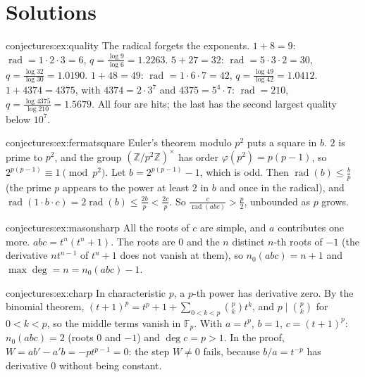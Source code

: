 \section{Solutions}

\begin{solution}{conjectures:ex:quality}
\idea The radical forgets the exponents.
\writeup $1+8=9$: $\operatorname{rad}=1\cdot2\cdot3=6$, $q=\frac{\log9}{\log6}=1.2263$. $5+27=32$: $\operatorname{rad}=5\cdot3\cdot2=30$,
$q=\frac{\log32}{\log30}=1.0190$. $1+48=49$: $\operatorname{rad}=1\cdot6\cdot7=42$, $q=\frac{\log49}{\log42}=1.0412$. $1+4374=4375$, with $4374=2\cdot3^7$ and
$4375=5^4\cdot7$: $\operatorname{rad}=210$, $q=\frac{\log4375}{\log210}=1.5679$. All four are hits; the last has the second largest quality below
$10^7$.
\end{solution}

\begin{solution}{conjectures:ex:fermatsquare}
\idea Euler's theorem modulo $p^2$ puts a square in $b$.
\writeup $2$ is prime to $p^2$, and the group $(\mathbb Z/p^2\mathbb Z)^\times$ has order $\varphi(p^2)=p(p-1)$, so $2^{p(p-1)}\equiv1\pmod{p^2}$. Let
$b=2^{p(p-1)}-1$, which is odd. Then $\operatorname{rad}(b)\le\frac bp$ (the prime $p$ appears to the power at least $2$ in $b$ and once in the radical),
and $\operatorname{rad}(1\cdot b\cdot c)=2\operatorname{rad}(b)\le\frac{2b}p<\frac{2c}p$. So $\frac c{\operatorname{rad}(abc)}>\frac p2$, unbounded as $p$ grows.
\end{solution}

\begin{solution}{conjectures:ex:masonsharp}
\idea All the roots of $c$ are simple, and $a$ contributes one more.
\writeup $abc=t^n(t^n+1)$. The roots are $0$ and the $n$ distinct $n$-th roots of $-1$ (the derivative $nt^{n-1}$ of $t^n+1$ does not vanish at them), so
$n_0(abc)=n+1$ and $\max\deg=n=n_0(abc)-1$.
\end{solution}

\begin{solution}{conjectures:ex:charp}
\idea In characteristic $p$, a $p$-th power has derivative zero.
\writeup By the binomial theorem, $(t+1)^p=t^p+1+\sum_{0<k<p}\binom pkt^k$, and $p\mid\binom pk$ for $0<k<p$, so the middle terms vanish in $\mathbb F_p$.
With $a=t^p$, $b=1$, $c=(t+1)^p$: $n_0(abc)=2$ (roots $0$ and $-1$) and $\deg c=p>1$. In the proof, $W=ab'-a'b=-pt^{p-1}=0$: the step $W\ne0$ fails,
because $b/a=t^{-p}$ has derivative $0$ without being constant.
\end{solution}

